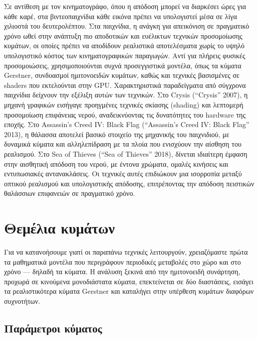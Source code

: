 \documentclass[a4paper, 11pt]{article}
\begin{document}
Σε αντίθεση με τον κινηματογράφο, όπου η απόδοση μπορεί να διαρκέσει
ώρες για κάθε καρέ, στα βιντεοπαιχνίδια κάθε εικόνα πρέπει να
υπολογιστεί μέσα σε λίγα χιλιοστά του δευτερολέπτου. Στα παιχνίδια, η
ανάγκη για απεικόνιση σε πραγματικό χρόνο ωθεί στην ανάπτυξη πιο
αποδοτικών και ευέλικτων τεχνικών προσομοίωσης κυμάτων, οι οποίες πρέπει
να αποδίδουν ρεαλιστικά αποτελέσματα χωρίς το υψηλό υπολογιστικό κόστος
των κινηματογραφικών παραγωγών. Αντί για πλήρεις φυσικές προσομοιώσεις,
χρησιμοποιούνται συχνά προσεγγιστικά μοντέλα, όπως τα κύματα Gerstner,
συνδυασμοί ημιτονοειδών κυμάτων, καθώς και τεχνικές βασισμένες σε
shaders που εκτελούνται στην GPU. Χαρακτηριστικά παραδείγματα από
σύγχρονα παιχνίδια δείχνουν την εξέλιξη αυτών των τεχνικών. Στο Crysis
({``Crysis''} 2007), η μηχανή γραφικών εισήγαγε προηγμένες τεχνικές
σκίασης (shading) και λεπτομερή προσομοίωση επιφάνειας νερού,
αναδεικνύοντας τις δυνατότητες του hardware της εποχής. Στο Assassin's
Creed IV: Black Flag ({``Assassin's Creed IV: Black Flag''} 2013), η
θάλασσα αποτελεί βασικό στοιχείο της μηχανικής του παιχνιδιού, με
δυναμικά κύματα και αλληλεπίδραση με τα πλοία που ενισχύουν την αίσθηση
του ρεαλισμού. Στο Sea of Thieves ({``Sea of Thieves''} 2018), δίνεται
ιδιαίτερη έμφαση στην αισθητική απόδοση του νερού, με έντονα χρώματα,
ομαλές κινήσεις και εντυπωσιακές αντανακλάσεις. Οι τεχνικές αυτές
επιδιώκουν μια ισορροπία μεταξύ οπτικού ρεαλισμού και υπολογιστικής
απόδοσης, επιτρέποντας την απόδοση πειστικών θαλάσσιων επιφανειών σε
πραγματικό χρόνο.

\section{Θεμέλια
κυμάτων}\label{ux3b8ux3b5ux3bcux3adux3bbux3b9ux3b1-ux3baux3c5ux3bcux3acux3c4ux3c9ux3bd}

Για να κατανοήσουμε γιατί οι παραπάνω τεχνικές λειτουργούν, χρειαζόμαστε
πρώτα τα μαθηματικά μοντέλα που περιγράφουν περιοδικές μεταβολές στο
χώρο και στο χρόνο --- δηλαδή τα κύματα. Η ανάλυση ξεκινά από την
ημιτονοειδή συνάρτηση, προχωρά σε κινούμενα μονοδιάστατα κύματα,
επεκτείνεται σε δύο διαστάσεις, εισάγει τα ρεαλιστικότερα κύματα
Gerstner και καταλήγει στην υπέρθεση κυμάτων διαφόρων συχνοτήτων.

\subsection{Παράμετροι
κύματος}\label{ux3c0ux3b1ux3c1ux3acux3bcux3b5ux3c4ux3c1ux3bfux3b9-ux3baux3cdux3bcux3b1ux3c4ux3bfux3c2}
\end{document}
